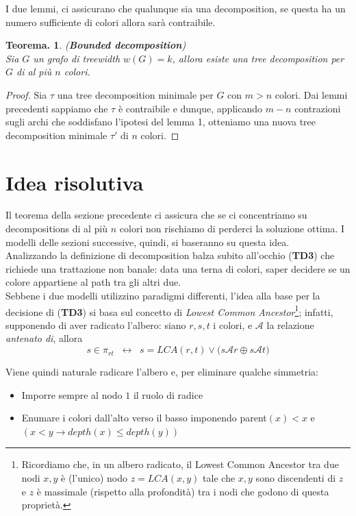 \documentclass{report}
\newtheorem{teo}{Teorema.}
\begin{document}
I due lemmi, ci assicurano che qualunque sia una decomposition, se questa ha un numero sufficiente di colori allora sarà contraibile.

\begin{teo}(\textbf{Bounded decomposition})\\
Sia $G$ un grafo di treewidth $w(G)=k$, allora esiste una tree decomposition per $G$ di al più $n$ colori.
\end{teo}
\begin{proof}
Sia $\tau$ una tree decomposition minimale per $G$ con $m > n$ colori. Dai lemmi precedenti sappiamo che $\tau$ è contraibile e dunque,
applicando $m-n$ contrazioni sugli archi che soddisfano l'ipotesi del lemma 1, otteniamo una nuova tree decomposition minimale $\tau'$ di $n$ colori.
\end{proof}

\section{Idea risolutiva}

Il teorema della sezione precedente ci assicura che se ci concentriamo su decompositions di al più $n$ colori non rischiamo di perderci la soluzione ottima.
I modelli delle sezioni successive, quindi, si baseranno su questa idea.\\

Analizzando la definizione di decomposition balza subito all'occhio (\textbf{TD3}) che richiede una trattazione non banale: data una terna di colori, saper decidere
se un colore appartiene al path tra gli altri due.\\

Sebbene i due modelli utilizzino paradigmi differenti, l'idea alla base per la decisione di (\textbf{TD3}) si basa sul
concetto di \textit{Lowest Common Ancestor}\footnote{Ricordiamo che, in un albero radicato, il Lowest Common Ancestor tra due nodi $x, y$ è (l'unico) nodo $z = LCA(x, y)$ tale che
$x, y$ sono discendenti di $z$ e $z$ è massimale (rispetto alla profondità) tra i nodi che godono di questa proprietà.}; infatti, supponendo di aver radicato l'albero: siano $r, s, t$ i colori,
e $\mathcal{A}$ la relazione \textit{antenato di}, allora
$$s \in \pi_{rt}\;\; \longleftrightarrow\;\; s = LCA(r, t) \lor \big(s\mathcal{A}r \oplus s\mathcal{A}t\big)$$

Viene quindi naturale radicare l'albero e, per eliminare qualche simmetria:
\begin{itemize}
	\item Imporre sempre al nodo $1$ il ruolo di radice
	\item Enumare i colori dall'alto verso il basso imponendo parent$(x)<x$ e\\ $(x<y \longrightarrow depth(x) \leq depth(y))$
\end{itemize}
\end{document}
